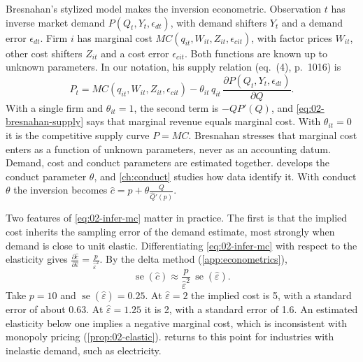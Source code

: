 Bresnahan's stylized model makes the inversion econometric. Observation $t$ has inverse market demand
$P(Q_t, Y_t, \epsilon_{dt})$, with demand shifters $Y_t$ and a demand error $\epsilon_{dt}$. Firm $i$ has marginal
cost $MC(q_{it}, W_{it}, Z_{it}, \epsilon_{cit})$, with factor prices $W_{it}$, other cost shifters $Z_{it}$ and a
cost error $\epsilon_{cit}$. Both functions are known up to unknown parameters. In our notation, his supply relation
(eq.~(4), p.~1016) is
\begin{equation}\label{eq:02-bresnahan-supply}
  P_t = MC(q_{it}, W_{it}, Z_{it}, \epsilon_{cit})
        - \theta_{it}\, q_{it}\, \frac{\partial P(Q_t, Y_t, \epsilon_{dt})}{\partial Q} .
\end{equation}
With a single firm and $\theta_{it} = 1$, the second term is $-QP'(Q)$, and \eqref{eq:02-bresnahan-supply} says
that marginal revenue equals marginal cost. With $\theta_{it} = 0$ it is the competitive supply curve $P = MC$.
Bresnahan stresses that marginal cost enters as a function of unknown parameters, never as an accounting datum.
Demand, cost and conduct parameters are estimated together.  develops the conduct parameter
$\theta$, and \cref{ch:conduct} studies how data identify it. With conduct $\theta$ the inversion becomes
$\hat c = p + \theta\frac{Q}{\hat Q'(p)}$.

Two features of \eqref{eq:02-infer-mc} matter in practice. The first is that the implied cost inherits the sampling
error of the demand estimate, most strongly when demand is close to unit elastic. Differentiating
\eqref{eq:02-infer-mc} with respect to the elasticity gives $\frac{\partial \hat c}{\partial \hat\varepsilon} =
\frac{p}{\hat\varepsilon^2}$. By the delta method (\cref{app:econometrics}),
\[
  \operatorname{se}(\hat c) \approx \frac{p}{\hat\varepsilon^2}\,\operatorname{se}(\hat\varepsilon) .
\]
Take $p = 10$ and $\operatorname{se}(\hat\varepsilon) = 0.25$. At $\hat\varepsilon = 2$ the implied cost is 5, with
a standard error of about 0.63. At $\hat\varepsilon = 1.25$ it is 2, with a standard error of 1.6. An estimated
elasticity below one implies a negative marginal cost, which is inconsistent with monopoly pricing
(\cref{prop:02-elastic}).  returns to this point for industries with inelastic demand, such as
electricity.

